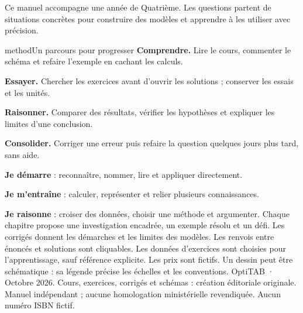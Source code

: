 \pagestyle{otFront}
Ce manuel accompagne une année de Quatrième. Les questions partent de situations concrètes pour construire des modèles et apprendre à les utiliser avec précision.
\begin{pcEncadre}{method}{Un parcours pour progresser}
\textbf{Comprendre.} Lire le cours, commenter le schéma et refaire l’exemple en cachant les calculs.\par
\textbf{Essayer.} Chercher les exercices avant d’ouvrir les solutions ; conserver les essais et les unités.\par
\textbf{Raisonner.} Comparer des résultats, vérifier les hypothèses et expliquer les limites d’une conclusion.\par
\textbf{Consolider.} Corriger une erreur puis refaire la question quelques jours plus tard, sans aide.
\end{pcEncadre}
\quad\textbf{Je démarre} : reconnaître, nommer, lire et appliquer directement.\par
{}\quad\textbf{Je m’entraîne} : calculer, représenter et relier plusieurs connaissances.\par
{}\quad\textbf{Je raisonne} : croiser des données, choisir une méthode et argumenter.
Chaque chapitre propose une investigation encadrée, un exemple résolu et un défi. Les corrigés donnent les démarches et les limites des modèles. Les renvois entre énoncés et solutions sont cliquables.
Les données d’exercices sont choisies pour l’apprentissage, sauf référence explicite. Les prix sont fictifs. Un dessin peut être schématique : sa légende précise les échelles et les conventions.
\vfill
{\small OptiTAB · Octobre 2026. Cours, exercices, corrigés et schémas : création éditoriale originale. Manuel indépendant ; aucune homologation ministérielle revendiquée. Aucun numéro ISBN fictif.}
\clearpage{}
\begingroup\setlength{\parskip}{0pt}
